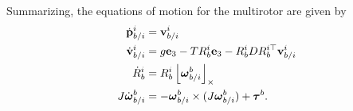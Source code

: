 Summarizing, the equations of motion for the multirotor are given by
\begin{align}
	\dot{\pbf}_{b/i}^i &= \vbf_{b/i}^i \label{eq:eom_p} \\
	\dot{\vbf}_{b/i}^i &= g \ebf_3 - TR_b^i \ebf_3 - R_b^i D R_b^{i\top} \vbf_{b/i}^i  \label{eq:eom_v} \\
	\dot{R}_b^i &= R_b^i \ss{\omegabf_{b/i}^b} \label{eq:eom_R} \\
	J\dot{\omegabf}_{b/i}^b &= -\omegabf_{b/i}^b \times (J\omegabf_{b/i}^b) + \taubf^b. \label{eq:eom_omega}
\end{align}



